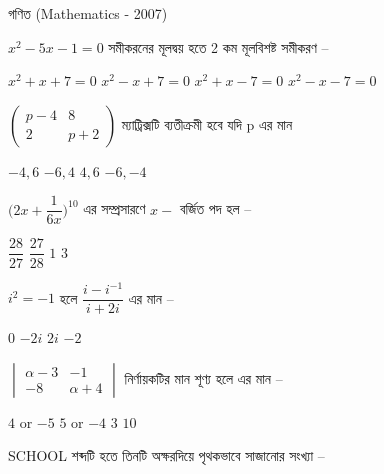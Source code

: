\documentclass[addpoints]{exam}
\begin{document}
\begin{LARGE}
\begin{center}
গণিত (Mathematics - 2007)
\end{center}
\end{LARGE}
\begin{questions}

\question  $ x^{2}-5x-1=0 $ সমীকরনের মূলদ্বয় হতে 2 কম মূলবিশষ্ট সমীকরণ –

\begin{oneparchoices}
\choice $ x^{2}+x+7=0 $
\choice $ x^{2}-x+7=0 $
\choice $ x^{2}+x-7=0 $
\choice $ x^{2}-x-7=0 $
\end{oneparchoices}

\question $ \begin{pmatrix}
p-4 & 8\\
2 & p+2
\end{pmatrix} $ ম্যাট্রিক্সটি ব্যতীক্রমী হবে যদি p এর মান 

\begin{oneparchoices}
\choice $ -4, 6 $
\choice $-6, 4$
\choice $ 4, 6$
\choice $-6, -4$
\end{oneparchoices}

\question $ \Bigg(2x + \dfrac{1}{6x} \Bigg)^{10} $ এর সম্প্রসারণে $ x- $ বর্জিত পদ হল – 

\begin{oneparchoices}
\choice $ \dfrac{28}{27} $
\choice $ \dfrac{27}{28} $
\choice $ 1 $
\choice  $ 3 $
\end{oneparchoices}

\question $ i^{2}=-1 $ হলে $ \dfrac{i-i^{-1}}{i+2i} $ এর মান –


\begin{oneparchoices}
\choice $ 0 $
\choice $ -2i $
\choice $ 2i $
\choice  $ -2 $
\end{oneparchoices}

\question $ \begin{vmatrix}
\alpha -3 & -1 \\
-8 & \alpha +4
\end{vmatrix} $ নির্ণায়কটির মান শূণ্য হলে এর মান – 

\begin{oneparchoices}
\choice $ 4$ or $-5 $
\choice $ 5$ or $-4 $
\choice $ 3 $
\choice $ 10 $
\end{oneparchoices}

\question SCHOOL শব্দটি হতে তিনটি অক্ষরদিয়ে পৃথকভাবে সাজানোর সংখ্যা – 

\begin{oneparchoices}
\end{oneparchoices}


\end{questions}
\end{document}
